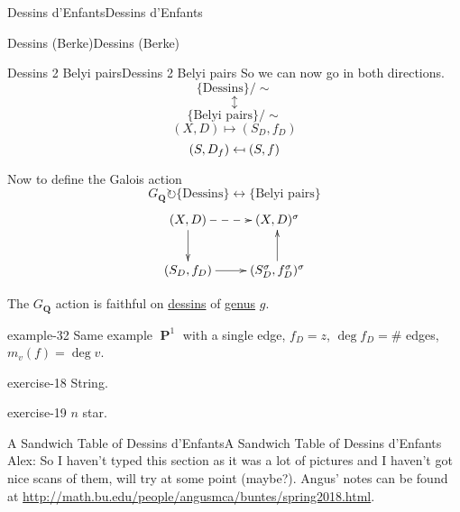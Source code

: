 \documentclass[10pt,]{book}
\numberwithin{equation}{section}
\providecommand\mapsfrom{\mathrel{\reflectbox{\ensuremath{\mapsto}}}}
\newcommand{\QQ}{\mathbf{Q}}
\newcommand{\acts}{\circlearrowright}
\DeclareMathOperator{\PP}{\mathbf{P}}
\begin{document}
\begin{chapterptx}{Dessins d'Enfants}{}{Dessins d'Enfants}{}{}
\begin{sectionptx}{Dessins (Berke)}{}{Dessins (Berke)}{}{}
\begin{subsectionptx}{Dessins 2 Belyi pairs}{}{Dessins 2 Belyi pairs}{}{}
\hypertarget{p-658}{}%
So we can now go in both directions.%
\begin{equation*}
\{\text{Dessins}\}/\sim
\end{equation*}
%
\begin{equation*}
\updownarrow
\end{equation*}
%
\begin{equation*}
\{\text{Belyi pairs}\}/\sim
\end{equation*}
%
\begin{equation*}
(X,D) \mapsto (S_D, f_D)
\end{equation*}
%
\begin{equation*}
(S, D_f) \mapsfrom (S,f)
\end{equation*}
%
\par
\hypertarget{p-659}{}%
Now to define the Galois action%
\begin{equation*}
G_\QQ\acts \{\text{Dessins}\}\leftrightarrow \{\text{Belyi pairs}\}
\end{equation*}
%
\begin{equation*}
\xymatrix{
(X,D)\ar[d] \ar@{-->}[r] & (X,D)^\sigma \\
(S_D,f_D)\ar[r] & (S_D^\sigma,f_D^\sigma)^\sigma \ar[u]
}
\end{equation*}
%
\par
\hypertarget{p-660}{}%
The \(G_\QQ\) action is faithful on \hyperref[def-dessin-denfant]{dessins} of \hyperref[def-class-set]{genus} \(g\).%
\begin{example}{}{example-32}%
\hypertarget{p-661}{}%
Same example \(\PP^1\) with a single edge, \(f_D  = z\), \(\deg f_D = \#\) edges, \(m_v(f)=  \deg v\).%
\end{example}
\begin{inlineexercise}{}{exercise-18}%
\hypertarget{p-662}{}%
String.%
\end{inlineexercise}
\begin{inlineexercise}{}{exercise-19}%
\hypertarget{p-663}{}%
\(n\) star.%
\end{inlineexercise}
\end{subsectionptx}
\end{sectionptx}
%
%
\typeout{************************************************}
\typeout{************************************************}
%
\begin{sectionptx}{A Sandwich Table of Dessins d'Enfants}{}{A Sandwich Table of Dessins d'Enfants}{}{}\label{sec-sandwich}
\hypertarget{p-664}{}%
Alex: So I haven't typed this section as it was a lot of pictures and I haven't got nice scans of them, will try at some point (maybe?). Angus' notes can be found at \url{http://math.bu.edu/people/angusmca/buntes/spring2018.html}.%

\end{sectionptx}
\end{chapterptx}
\end{document}
